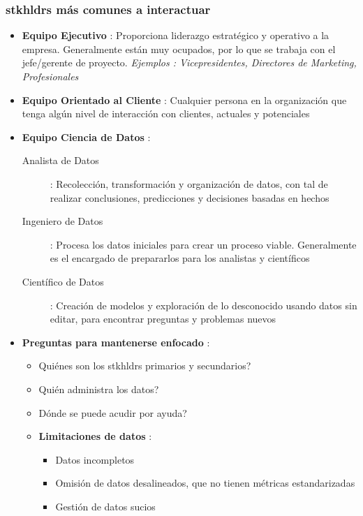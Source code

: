\subsubsection{\gls{stkhldrs} más comunes a interactuar}
\begin{itemize}
    \item {\textbf{Equipo Ejecutivo} : Proporciona liderazgo estratégico y operativo a la empresa. Generalmente están muy ocupados, por lo que se trabaja con el jefe/gerente de proyecto. \textit{Ejemplos : Vicepresidentes, Directores de Marketing, Profesionales}}
    \item {\textbf{Equipo Orientado al Cliente} : Cualquier persona en la organización que tenga algún nivel de interacción con clientes, actuales y potenciales}
    \item {\textbf{Equipo Ciencia de Datos} : 
    \begin{description}
        \item[Analista de Datos]{: Recolección, transformación y organización de datos, con tal de realizar conclusiones, predicciones y decisiones basadas en hechos}
        \item[Ingeniero de Datos]{ : Procesa los datos iniciales para crear un proceso viable. Generalmente es el encargado de prepararlos para los analistas y científicos}
        \item[Científico de Datos]{ : Creación de modelos y exploración de lo desconocido usando datos sin editar, para encontrar preguntas y problemas nuevos}
    \end{description}}
    \item{\textbf{Preguntas para mantenerse enfocado} : 
    \begin{itemize}
        \item {Quiénes son los \gls{stkhldrs} primarios y secundarios?}
        \item {Quién administra los datos?}
        \item {Dónde se puede acudir por ayuda?}
        \item {\textbf{Limitaciones de datos} : 
        \begin{itemize}
            \item{Datos incompletos}
            \item{Omisión de datos desalineados, que no tienen métricas estandarizadas}
            \item{Gestión de datos sucios}
        \end{itemize}}
    \end{itemize}}
\end{itemize}

